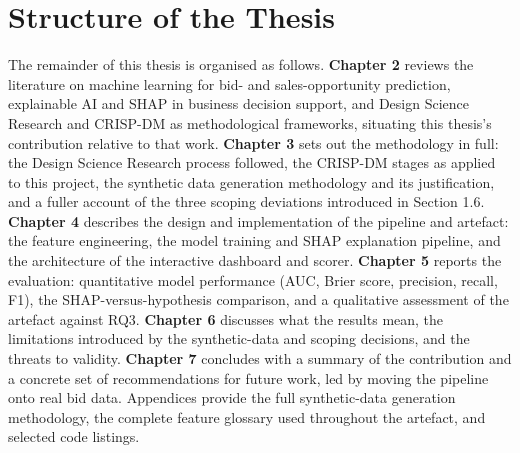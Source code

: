 \hypertarget{structure-of-the-thesis}{%
\section{Structure of the Thesis}\label{structure-of-the-thesis}}

The remainder of this thesis is organised as follows. \textbf{Chapter 2}
reviews the literature on machine learning for bid- and
sales-opportunity prediction, explainable AI and SHAP in business
decision support, and Design Science Research and CRISP-DM as
methodological frameworks, situating this thesis's contribution relative
to that work. \textbf{Chapter 3} sets out the methodology in full: the
Design Science Research process followed, the CRISP-DM stages as applied
to this project, the synthetic data generation methodology and its
justification, and a fuller account of the three scoping deviations
introduced in Section 1.6. \textbf{Chapter 4} describes the design and
implementation of the pipeline and artefact: the feature engineering,
the model training and SHAP explanation pipeline, and the architecture
of the interactive dashboard and scorer. \textbf{Chapter 5} reports the
evaluation: quantitative model performance (AUC, Brier score, precision,
recall, F1), the SHAP-versus-hypothesis comparison, and a qualitative
assessment of the artefact against RQ3. \textbf{Chapter 6} discusses
what the results mean, the limitations introduced by the synthetic-data
and scoping decisions, and the threats to validity. \textbf{Chapter 7}
concludes with a summary of the contribution and a concrete set of
recommendations for future work, led by moving the pipeline onto real
bid data. Appendices provide the full synthetic-data generation
methodology, the complete feature glossary used throughout the artefact,
and selected code listings.
